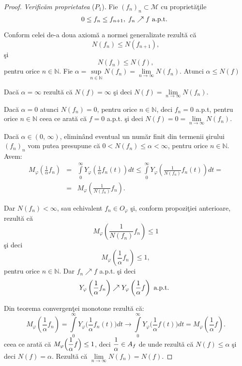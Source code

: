 \documentclass[ a4paper, 12pt]{report}
\theoremstyle{definition}
\theoremstyle{remark}
\numberwithin{equation}{section}
\begin{document}
\begin{proof} \emph{Verific\u am proprietatea} ($P_1$). Fie $(f_n)_n \subset \mathcal{M}$ cu propriet\u a\c tile
$$0 \leq f_n \leq f_{n+1}, \; f_n \nearrow f \hbox{ a.p.t. }$$

Conform celei de-a doua axiom\u a a normei generalizate rezult\u a c\u  a
$$N(f_n) \leq N(f_{n+1}),$$ \c si
$$N(f_n) \leq N(f),$$  pentru orice $n \in \mathbb{N}$.
Fie $\alpha = \sup\limits_{n \in \mathbb{N}}N(f_n) = \lim\limits_{n \to \infty} N(f_n)$.
Atunci $ \alpha \leq N(f)$

Dac\u a $\alpha = \infty$ rezult\u a c\u a $N(f) = \infty$ \c si deci $N(f) = \lim\limits_{n \to \infty} N(f_n)$.

Dac\u a $\alpha = 0$ atunci $N(f_n) = 0$, pentru orice $n \in \mathbb{N}$, deci $f_n = 0$ a.p.t, pentru orice $n \in \mathbb{N}$ ceea ce arat\u a c\u  a  $f = 0$ a.p.t.  \c si deci $N(f) = 0 = \lim\limits_{n \to \infty} N(f_n)$.

Dac\u a $\alpha \in (0, \, \infty)$, elimin\^ and eventual un num\u ar finit din termenii \c sirului $(f_n)_n$ vom putea presupune c\u  a $0 < N(f_n) \leq \alpha < \infty$, pentru orice $n \in \mathbb{N}$. Avem:
\begin{eqnarray*}
M_\varphi\left (\frac{1}{\alpha}f_n\right ) &=& \int\limits_{0}^{\infty} Y_\varphi\left(\frac{1}{\alpha} f_n(t)\right) dt \leq \int\limits_{0}^{\infty}Y_\varphi\left (\frac{1}{N(f_n)}f_n(t)\right ) dt = \\
&=& M_\varphi\left(\frac{1}{N(f_n)} f_n\right).
\end{eqnarray*}

Dar $N(f_n) < \infty$, sau echivalent $f_n \in O_\varphi$ \c si, conform propozi\c tiei anterioare, rezult\u a c\u a
$$M_\varphi\left (\frac{1}{N(f_n)}f_n\right ) \leq 1$$ \c si deci
$$ M_\varphi\left (\frac{1}{\alpha} f_n  \right ) \leq 1,$$ pentru orice $n \in \mathbb{N}$. Dar $f_n \nearrow f$ a.p.t.  \c si deci
$$Y_\varphi\left (\frac{1}{\alpha}f_n \right ) \nearrow Y_\varphi\left (\frac{1}{\alpha}f \right ) \hbox{ a.p.t. }$$

Din teorema convergen\c tei monotone rezult\u a c\u a:
$$M_\varphi\left (\frac{1}{\alpha}f_n\right ) = \int\limits_{0}^{\infty}Y_\varphi\Big(\frac{1}{\alpha}f_n(t)\Big) dt \rightarrow \int\limits_{0}^{\infty} Y_\varphi\Big(\frac{1}{\alpha}f(t)\Big) dt = M_\varphi\left (\frac{1}{\alpha}f\right ).$$ ceea ce arat\u a c\u a
$M_\varphi\Big(\displaystyle\frac{1}{\alpha}f\Big)\leq 1 $, deci $\displaystyle\frac{1}{\alpha} \in A_f$ de unde rezult\u a c\u  a $N(f) \leq \alpha$ \c si deci $N(f) = \alpha$. Rezult\u a c\u a $\lim\limits_{n \rightarrow \infty} N(f_n) = N(f)$.


\end{proof}
\end{document}
